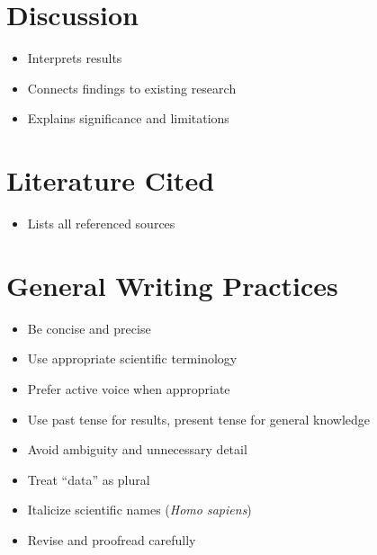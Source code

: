 \documentclass[
  letterpaper,
  DIV=11,
  numbers=noendperiod]{scrreprt}
\providecommand{\tightlist}{%
  \setlength{\itemsep}{0pt}\setlength{\parskip}{0pt}}
\begin{document}
\section*{\texorpdfstring{\textbf{Discussion}}{Discussion}}\label{discussion}


\begin{itemize}
\item
  Interprets results
\item
  Connects findings to existing research
\item
  Explains significance and limitations
\end{itemize}

\section*{\texorpdfstring{\textbf{Literature
Cited}}{Literature Cited}}\label{literature-cited}


\begin{itemize}
\tightlist
\item
  Lists all referenced sources
\end{itemize}

\section*{\texorpdfstring{\textbf{General Writing
Practices}}{General Writing Practices}}\label{general-writing-practices}


\begin{itemize}
\item
  Be concise and precise
\item
  Use appropriate scientific terminology
\item
  Prefer active voice when appropriate
\item
  Use past tense for results, present tense for general knowledge
\item
  Avoid ambiguity and unnecessary detail
\item
  Treat ``data'' as plural
\item
  Italicize scientific names (\emph{Homo sapiens})
\item
  Revise and proofread carefully
\end{itemize}
\end{document}
